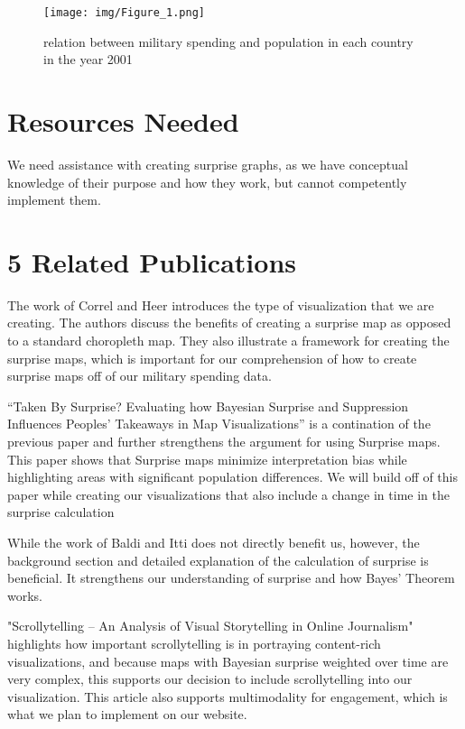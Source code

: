 \documentclass{proc}
\begin{document}
\begin{figure*}[t]
    \centering
      \texttt{[image: img/Figure\_1.png]}
      \caption{relation between military spending and population in each country in the year 2001}
    \label{fig:figure1}
  \end{figure*}

\section{Resources Needed}

We need assistance with creating surprise graphs, as we have conceptual knowledge of their purpose and how they work, but cannot competently implement them. 

\section{5 Related Publications}

The work of Correl and Heer \cite{correll2016surprise} introduces the type of visualization that we are creating. The authors discuss the benefits of creating a surprise map as opposed to a standard choropleth map. They also illustrate a framework for creating the surprise maps, which is important for our comprehension of how to create surprise maps off of our military spending data.

“Taken By Surprise? Evaluating how Bayesian Surprise and Suppression Influences Peoples’ Takeaways in Map Visualizations” \cite{ndlovu2023taken} is a contination of the previous paper and further strengthens the argument for using Surprise maps. This paper shows that Surprise maps minimize interpretation bias while highlighting areas with significant population differences. We will build off of this paper while creating our visualizations that also include a change in time in the surprise calculation

While the work of Baldi and Itti \cite{baldi2010bits} does not directly benefit us, however, the background section and detailed explanation of the calculation of surprise is beneficial. It strengthens our understanding of surprise and how Bayes’ Theorem works. 

"Scrollytelling – An Analysis of Visual Storytelling in Online Journalism" \cite{seyser2018scrollytelling} highlights how important scrollytelling is in portraying content-rich visualizations, and because maps with Bayesian surprise weighted over time are very complex, this supports our decision to include scrollytelling into our visualization. This article also supports multimodality for engagement, which is what we plan to implement on our website.
\end{document}
